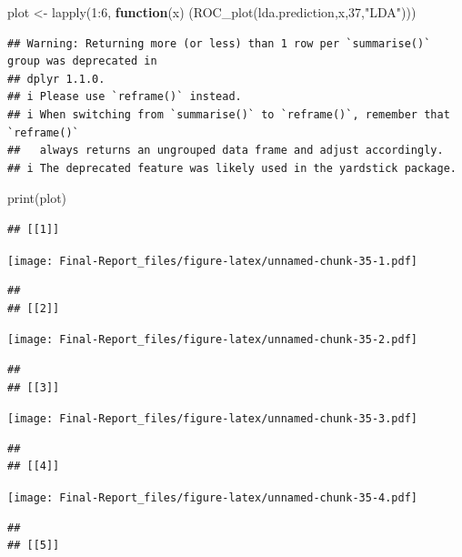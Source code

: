 \documentclass[
]{article}
\newenvironment{Shaded}{\begin{snugshade}}{\end{snugshade}}
\newcommand{\ControlFlowTok}[1]{\textcolor[rgb]{0.13,0.29,0.53}{\textbf{#1}}}
\newcommand{\DecValTok}[1]{\textcolor[rgb]{0.00,0.00,0.81}{#1}}
\newcommand{\FunctionTok}[1]{\textcolor[rgb]{0.00,0.00,0.00}{#1}}
\newcommand{\NormalTok}[1]{#1}
\newcommand{\OtherTok}[1]{\textcolor[rgb]{0.56,0.35,0.01}{#1}}
\newcommand{\SpecialCharTok}[1]{\textcolor[rgb]{0.00,0.00,0.00}{#1}}
\newcommand{\StringTok}[1]{\textcolor[rgb]{0.31,0.60,0.02}{#1}}
\begin{document}
\begin{Shaded}
\begin{Highlighting}[]
\NormalTok{plot }\OtherTok{\textless{}{-}} \FunctionTok{lapply}\NormalTok{(}\DecValTok{1}\SpecialCharTok{:}\DecValTok{6}\NormalTok{, }\ControlFlowTok{function}\NormalTok{(x) (}\FunctionTok{ROC\_plot}\NormalTok{(lda.prediction,x,}\DecValTok{37}\NormalTok{,}\StringTok{"LDA"}\NormalTok{)))}
\end{Highlighting}
\end{Shaded}

\begin{verbatim}
## Warning: Returning more (or less) than 1 row per `summarise()` group was deprecated in
## dplyr 1.1.0.
## i Please use `reframe()` instead.
## i When switching from `summarise()` to `reframe()`, remember that `reframe()`
##   always returns an ungrouped data frame and adjust accordingly.
## i The deprecated feature was likely used in the yardstick package.
\end{verbatim}

\begin{Shaded}
\begin{Highlighting}[]
\FunctionTok{print}\NormalTok{(plot)}
\end{Highlighting}
\end{Shaded}

\begin{verbatim}
## [[1]]
\end{verbatim}

\texttt{[image: Final-Report\_files/figure-latex/unnamed-chunk-35-1.pdf]}

\begin{verbatim}
## 
## [[2]]
\end{verbatim}

\texttt{[image: Final-Report\_files/figure-latex/unnamed-chunk-35-2.pdf]}

\begin{verbatim}
## 
## [[3]]
\end{verbatim}

\texttt{[image: Final-Report\_files/figure-latex/unnamed-chunk-35-3.pdf]}

\begin{verbatim}
## 
## [[4]]
\end{verbatim}

\texttt{[image: Final-Report\_files/figure-latex/unnamed-chunk-35-4.pdf]}

\begin{verbatim}
## 
## [[5]]
\end{verbatim}
\end{document}
